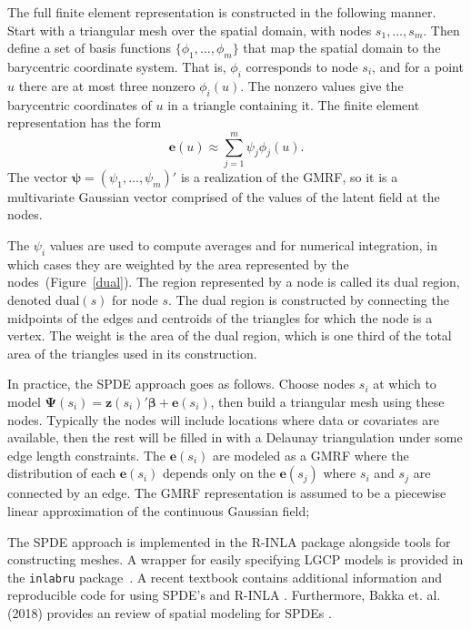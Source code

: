 \documentclass{interact}
\begin{document}
The full finite element representation is constructed in the following manner.
Start with a triangular mesh over the spatial domain, with nodes
\(s_{1}, \dots, s_{m}\). Then define a set of basis functions
\(\{\phi_{1}, \dots, \phi_{m}\}\) that map the spatial domain to the
barycentric coordinate system. That is, \(\phi_{i}\) corresponds to node
\(s_{i}\), and for a point \(u\) there are at most three nonzero
\(\phi_{i}(u)\). The nonzero values give the barycentric coordinates of \(u\)
in a triangle containing it. The finite element representation has the form
\begin{equation}
\mathbf{e}(u) \approx \sum_{j = 1}^{m} \psi_{j} \phi_{j}(u).
\end{equation}
The vector \(\boldsymbol{\psi} = (\psi_{1}, \dots, \psi_{m})'\) is a
realization of the GMRF, so it is a multivariate Gaussian vector comprised of
the values of the latent field at the nodes.

The \(\psi_{i}\) values are used to compute averages and for numerical
integration, in which cases they are weighted by the area represented by the
nodes~(Figure~\ref{dual}). The region represented by a node is called its dual
region, denoted \(\mathrm{dual}(s)\) for node \(s\). The dual region is
constructed by connecting the midpoints of the edges and centroids of the
triangles for which the node is a vertex. The weight is the area of the dual
region, which is one third of the total area of the triangles used in its
construction.

In practice, the SPDE approach goes as follows. Choose nodes \(s_{i}\)
at which to model \(\boldsymbol{\Psi}(s_{i})
= \mathbf{z}(s_{i})' \boldsymbol{\beta} + \mathbf{e}(s_{i})\), then build a
triangular mesh using these nodes. Typically the nodes will include locations
where data or covariates are available, then the rest will be filled in with a
Delaunay triangulation under some edge length constraints. The
\(\mathbf{e}(s_{i})\) are modeled as a GMRF where the distribution of
each \(\mathbf{e}(s_{i})\) depends only on the
\(\mathbf{e}(s_{j})\) where \(s_{i}\) and \(s_{j}\) are connected by an
edge. The GMRF representation is assumed to be a piecewise linear approximation
of the continuous Gaussian field;

The SPDE approach is implemented in the R-INLA package alongside tools
for constructing meshes. A wrapper for easily specifying LGCP models is
provided in the \texttt{inlabru} package~\cite{inlabru}. A recent textbook contains additional information and reproducible code for using SPDE's and R-INLA \cite{krainski2018}. Furthermore, Bakka et. al. (2018) provides an review of spatial modeling for SPDEs \cite{bakka2018spatial}.
\end{document}
